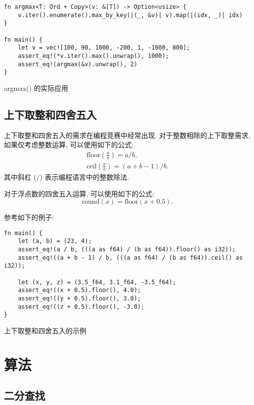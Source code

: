 \documentclass{crbook}
\begin{document}
\begin{listing}
    \linespread{1}
    \begin{verbatim}
fn argmax<T: Ord + Copy>(v: &[T]) -> Option<usize> {
    v.iter().enumerate().max_by_key(|(_, &v)| v).map(|(idx, _)| idx)
}

fn main() {
    let v = vec![100, 90, 1000, -200, 1, -1000, 800];
    assert_eq!(*v.iter().max().unwrap(), 1000);
    assert_eq!(argmax(&v).unwrap(), 2)
}
    \end{verbatim}
    \caption{argmax() 的实际应用}
\end{listing}

\subsection{上下取整和四舍五入}

上下取整和四舍五入的需求在编程竞赛中经常出现. 对于整数相除的上下取整需求, 如果仅考虑整数运算, 可以使用如下的公式:
\begin{gather*}
    \mathrm{floor}\left(\frac{a}{b}\right)=a/b, \\
    \mathrm{ceil}\left(\frac{a}{b}\right)=(a+b-1)/b.
\end{gather*}
其中斜杠 ($/$) 表示编程语言中的整数除法.

对于浮点数的四舍五入运算, 可以使用如下的公式:
\begin{equation*}
    \mathrm{round}(x)=\mathrm{floor}(x+0.5).
\end{equation*}

参考如下的例子:
\begin{listing}
    \linespread{1}
    \begin{verbatim}
fn main() {
    let (a, b) = (23, 4);
    assert_eq!(a / b, (((a as f64) / (b as f64)).floor() as i32));
    assert_eq!((a + b - 1) / b, (((a as f64) / (b as f64)).ceil() as i32));
    
    let (x, y, z) = (3.5_f64, 3.1_f64, -3.5_f64);
    assert_eq!((x + 0.5).floor(), 4.0);
    assert_eq!((y + 0.5).floor(), 3.0);
    assert_eq!((z + 0.5).floor(), -3.0);
}
    \end{verbatim}
    \caption{上下取整和四舍五入的示例}
\end{listing}


\newpage
\section{算法}
\subsection{二分查找}
\end{document}
